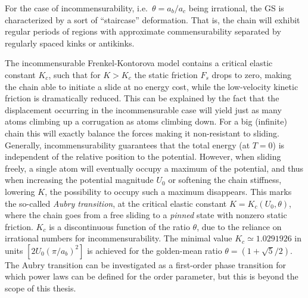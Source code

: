 



For the case of incommensurability, i.e.\ $\theta = a_b/a_c$ being irrational,
the \acrshort{GS} is characterized by a sort of ``staircase''  deformation. That
is, the chain will exhibit regular periods of regions with approximate
commensurability separated by regularly spaced kinks or antikinks. 


The incommensurable Frenkel-Kontorova model contains a critical elastic constant $K_c$, such that for $K > K_c$ the static friction $F_s$ drops to zero, making the chain able to initiate a slide at no energy cost, while the low-velocity kinetic friction is dramatically reduced. This can be explained by the
fact that the displacement occurring in the incommensurable case will yield just
as many atoms climbing up a corrugation as atoms climbing down. For a big (infinite) chain this will exactly balance the forces making it
non-resistant to sliding. Generally, incommensurability guarantees that the
total energy (at $T=0$) is independent of the relative position to the
potential. However, when sliding freely, a single atom will eventually occupy a
maximum of the potential, and thus when increasing the potential magnitude $U_0$ or
softening the chain stiffness, lowering $K$, the possibility to occupy such a
maximum disappears. This marks the so-called \textit{Aubry transition},
at the critical elastic constant $K = K_c(U_0, \theta)$, where the chain goes
from a free sliding to a \textit{pinned} state with nonzero static friction.
$K_c$ is a discontinuous function of the ratio $\theta$, due to the reliance on
irrational numbers for incommensurability. The minimal
value $K_c \simeq 1.0291926 $ in units $[2 U_0 (\pi / a_b)^2]$ is achieved for
the golden-mean ratio $\theta = (1+\sqrt{5}/2)$. The Aubry transition can be investigated as a first-order phase transition for which power laws can be defined for the order parameter, but this is beyond the scope of this thesis.



